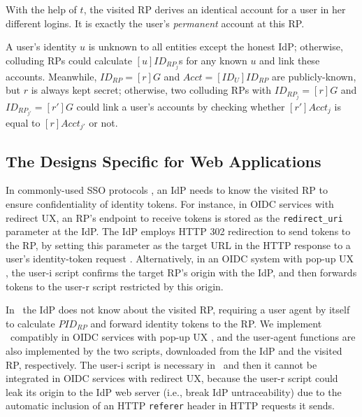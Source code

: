 With the help of $t$, the visited RP derives an identical account for a user in her different logins. It is exactly the user's \emph{permanent} account at this RP.

A user's identity $u$ is unknown to all entities except the honest IdP; otherwise, colluding RPs could calculate $[u]ID_{RP_j}$s for any known $u$ and link these accounts.
Meanwhile, $ID_{RP} = [r]G$ and $Acct = [ID_U]ID_{RP}$ are publicly-known,
 but $r$ is always kept secret;
otherwise, two colluding RPs with $ID_{RP_j} = [r]G$ and $ID_{RP_{j'}} = [r']G$ could link a user's accounts by checking whether $[r']Acct_j$ is equal to $[r]Acct_{j'}$ or not.

\subsection{The Designs Specific for Web Applications}
\label{sec:web-design}


In commonly-used SSO protocols \cite{OpenIDConnect,rfc6749, SAML, SAMLIdentifier},
an IdP needs to know the visited RP to ensure confidentiality of identity tokens. For instance, in OIDC services with redirect UX, an RP's endpoint to receive tokens is stored as the \texttt{redirect\_uri} parameter at the IdP.
The IdP employs HTTP 302 redirection to send tokens to the RP, by setting this parameter as the target URL in the HTTP response to a user's identity-token request \cite{OpenIDConnect}.
Alternatively, in an OIDC system with pop-up UX  \cite{dimvaLiM16,GoogleIdIntegrate,uber}, the user-i script confirms the target RP's origin with the IdP, and then forwards tokens to the user-r script restricted by this origin.

In \usso\ the IdP does not know about the visited RP, requiring a user agent by itself to calculate $PID_{RP}$ and forward identity tokens to the RP.
We implement \usso\ compatibly in OIDC services with pop-up UX \cite{GoogleIdIntegrate,uber},
 and the user-agent functions are also implemented by the two scripts,
    downloaded from the IdP and the visited RP, respectively.
The user-i script is necessary in \usso\ and then it cannot be integrated in OIDC services with redirect UX, 
because the user-r script could leak its origin to the IdP web server (i.e., break IdP untraceability) due to the automatic inclusion of an HTTP \texttt{referer} header in HTTP requests it sends.


